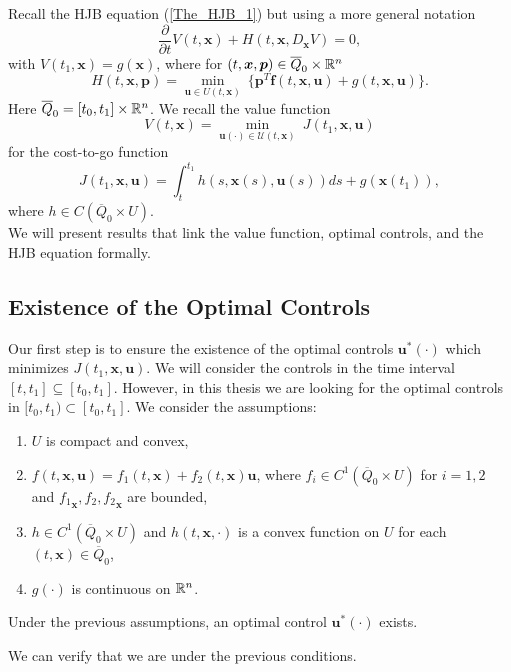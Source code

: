 Recall the HJB equation (\ref{The_HJB_1}) but using a more general notation
\begin{equation}
\frac{\partial}{\partial t}V(t,\bm{x})+H(t,\bm{x},D_{\bm{x}}V)=0,
\label{TheHJB}
\end{equation}
with $V(t_1,\bm{x})=g(\bm{x})$, where for $(t,\bm{x},\bm{p})\in\overline{Q}_0\times\mathbb{R}^n$
\begin{equation}
H(t,\bm{x},\bm{p})=\min_{\bm{u}\in U(t,\bm{x})}\ \{\bm{p}^T\bm{f}(t,\bm{x},\bm{u})+g(t,\bm{x},\bm{u})\}.
\end{equation}
Here $\overline{Q}_0=[t_0,t_1]\times \mathbb{R}^n$. We recall the value function
\begin{equation}
V(t,\bm{x})=\min_{\bm{u}(\cdot)\in\mathcal{U}(t,\bm{x})}\ J(t_1,\bm{x},\bm{u})
\label{VF}
\end{equation}
for the cost-to-go function
\begin{equation}
J(t_1,\bm{x},\bm{u})=\int_t^{t_1}h(s,\bm{x}(s),\bm{u}(s))ds+g(\bm{x}(t_1)),
\end{equation}
where $h\in C(\overline{Q}_0\times U)$.\\
We will present results that link the value function, optimal controls, and the HJB equation formally.

\subsection{Existence of the Optimal Controls}

Our first step is to ensure the existence of the optimal controls $\bm{u}^*(\cdot)$ which minimizes $J(t_1,\bm{x},\bm{u})$. We will consider the controls in the time interval $[t,t_1]\subseteq[t_0,t_1]$. However, in this thesis we are looking for the optimal controls in $[t_0,t_1)\subset[t_0,t_1]$. We consider the assumptions:
\begin{enumerate}

\item $U$ is compact and convex,

\item $f(t,\bm{x},\bm{u})=f_1(t,\bm{x})+f_2(t,\bm{x})\bm{u}$, where $f_i\in C^1(\overline{Q}_0\times U)$ for $i=1,2$ and ${f_1}_{\bm{x}},f_2,{f_2}_{\bm{x}}$ are bounded,

\item $h\in C^1(\overline{Q}_0\times U)$ and $h(t,\bm{x},\cdot)$ is a convex function on $U$ for each $(t,\bm{x})\in\overline{Q}_0$,

\item $g(\cdot)$ is continuous on $\mathbb{R}^n$.

\end{enumerate}
\begin{theorem} \label{Existence_Theorem}
Under the previous assumptions, an optimal control $\bm{u}^*(\cdot)$ exists.
\end{theorem}
We can verify that we are under the previous conditions.

